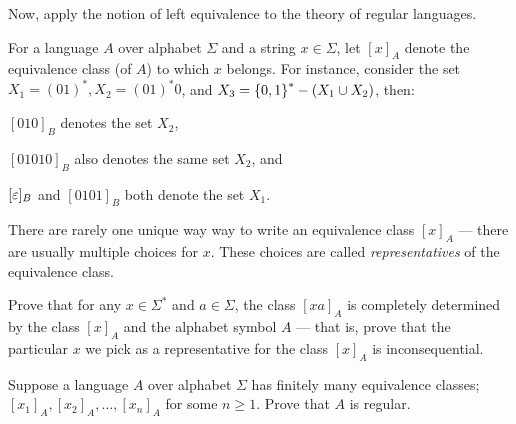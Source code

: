 \begin{problem}
  Now, apply the notion of left equivalence to the theory
  of regular languages.

  \begin{enumalph}
    \item For a language $A$ over alphabet $\Sigma$ and a string $x \in \Sigma$,
      let $[x]_A$ denote the equivalence class (of $A$) to which $x$ belongs.
      For instance, consider the set $X_1 = (01)^*, X_2 = (01)^*0$,
      and $X_3 = \left\{0, 1\right\}^* - (X_1 \cup X_2)$, then:
      \begin{enumroman}
        \item $[010]_{B}$ denotes the set $X_2$,
        \item $[01010]_{B}$ also denotes the same set $X_2$, and
        \item $[\varepsilon]_B$ and $[0101]_B$ both denote the set $X_1$.
      \end{enumroman}

      \step
      There are rarely one unique way way to write an equivalence class
      $[x]_A$ --- there are usually multiple choices for $x$.
      These choices are called \emph{representatives}
      of the equivalence class.

      \step
      Prove that for any $x \in \Sigma^*$ and $a \in \Sigma$,
      the class $[xa]_A$ is completely determined by the class $[x]_A$
      and the alphabet symbol $A$ ---
      that is, prove that the particular $x$ we pick as a representative
      for the class $[x]_A$ is inconsequential.
      \begin{Answer}
        
      \end{Answer}

    \item Suppose a language $A$ over alphabet $\Sigma$ has finitely many
      equivalence classes; $[x_1]_A, [x_2]_A, \ldots, [x_n]_A$ for some
      $n \ge 1$. Prove that $A$ is regular.
      \begin{Answer}

      \end{Answer}
  \end{enumalph}
\end{problem}
